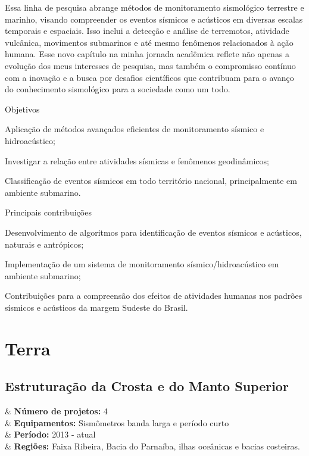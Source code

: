 \documentclass[10pt,a4paper,oneside]{book}
\begin{document}
\bigskip

Essa linha de pesquisa abrange métodos de monitoramento sismológico terrestre e marinho, visando compreender os eventos sísmicos e acústicos em diversas escalas temporais e espaciais. Isso inclui a detecção e análise de terremotos, atividade vulcânica, movimentos submarinos e até mesmo fenômenos relacionados à ação humana. Esse novo capítulo na minha jornada acadêmica reflete não apenas a evolução dos meus interesses de pesquisa, mas também o compromisso contínuo com a inovação e a busca por desafios científicos que contribuam para o avanço do conhecimento sismológico para a sociedade como um todo.

\begin{fancyenum}{\faFutbol}{Objetivos}
  \item Aplicação de métodos avançados eficientes de monitoramento sísmico e hidroacústico;
  \item Investigar a relação entre atividades sísmicas e fenômenos geodinâmicos;
  \item Classificação de eventos sísmicos em todo território nacional, principalmente em ambiente submarino.
\end{fancyenum}

\begin{fancyenum}{\faCogs}{Principais contribuições}
  \item Desenvolvimento de algoritmos para identificação de eventos sísmicos e acústicos, naturais e antrópicos;
  \item Implementação de um sistema de monitoramento sísmico/hidroacústico em ambiente submarino;
  \item Contribuições para a compreensão dos efeitos de atividades humanas nos padrões sísmicos e acústicos da margem Sudeste do Brasil.
\end{fancyenum}

\chapter{Terra}
\label{cap_terra}

\section{Estruturação da Crosta e do Manto Superior}

\begin{summarybox}[frametitle=\faProjectDiagram{}\quad Panorama da linha de pesquisa]
	\begin{datelist}
		\faFile* & \textbf{Número de projetos:} 4 \\
		\faBinoculars & \textbf{Equipamentos:} Sismômetros banda larga e período curto \\
		\faCalendar*[regular] & \textbf{Período:} 2013 - atual \\
		\faMapMarked* & \textbf{Regiões:} Faixa Ribeira, Bacia do Parnaíba, ilhas oceânicas e bacias costeiras. \\
	\end{datelist}
\end{summarybox}
\end{document}
